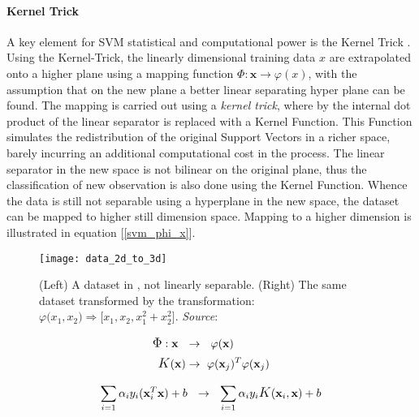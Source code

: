 	\paragraph{Kernel Trick}
	A key element for SVM statistical and computational power is the Kernel Trick \cite{guyon1993automatic}. Using the Kernel-Trick, the linearly dimensional training data $x$ are extrapolated onto a higher plane using a mapping function $\Phi:\textbf{x} \rightarrow \varphi(x)$, with the assumption that on the new plane a better linear separating hyper plane can be found. The mapping is carried out using a \textit{kernel trick}, where by the internal dot product of the linear separator is replaced with a Kernel Function. This Function simulates the redistribution of the original Support Vectors in a richer space, barely incurring an additional computational cost in the process. The linear separator in the new space is not bilinear on the original plane, thus the classification of new observation is also done using the Kernel Function. Whence the data is still not separable using a hyperplane in the new space, the dataset can be mapped to higher still dimension space. Mapping to a higher dimension is illustrated in equation [\ref{svm_phi_x}].
	
	\begin{figure}[h]
		\centering
		\captionsetup{width=0.8\textwidth}
		\texttt{[image: data\_2d\_to\_3d]}
		\caption[SVM Dimensionianl Extrapolation]{
			\footnotesize{
				(Left) A dataset in  , not linearly separable. (Right) The same dataset transformed by the transformation:
				$\varphi \big(x_1, x_2\big) \Rightarrow \big[ x_1,x_2,x_1^2+x_2^2 \big]$.
				\color{red} \textit{Source}:\cite{kimso}
			}
		}
	\end{figure}

	\begin{equation}
		\begin{aligned}
			\mathlarger{\Phi}: \textbf{x} \ \ &\rightarrow \ \  \varphi(\textbf{x}) \\
			\mathlarger{K}(\textbf{x}) &\rightarrow \ \varphi(\textbf{x}_j)^T \varphi(\textbf{x}_j)
		\end{aligned}
		\label{svm_phi_x}
	\end{equation}
	
	\begin{equation}
		\sum_{i=1} \alpha_i y_i (\textbf{x}_i^T \textbf{x}) + b  \ \  \rightarrow \ \ 
		\sum_{i=1} \alpha_i y_i \mathlarger{K}(\textbf{x}_i, \textbf{x}) + b
		\label{svm_insert_kernel}
	\end{equation}
	

